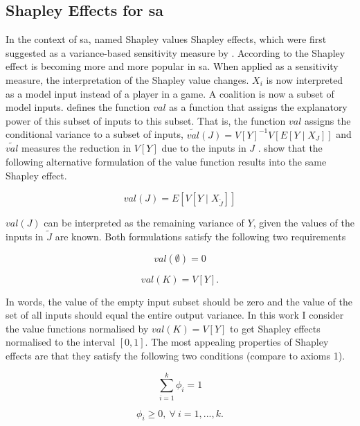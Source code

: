 \subsection{Shapley Effects for sa}

In the context of sa, \cite{SNS16} named Shapley values Shapley effects, which were first suggested as a variance-based sensitivity measure by \cite{O14}. According to \cite{PRB20} the Shapley effect is becoming more and more popular in sa.
When applied as a sensitivity measure, the interpretation of the Shapley value changes. $X_i$ is now interpreted as a model input instead of a player in a game. A coalition is now a subset of model inputs. \cite{O14} defines the function $val$ as a function that assigns the explanatory power of this subset of inputs to this subset. That is, the function $val$ assigns the conditional variance to a subset of inputs, $\tilde{val}(J)=V[Y]^{-1}V[E[Y \mid X_J]]$ and $\tilde{val}$ measures the reduction in $V[Y]$ due to the inputs in $J$ \cite{SNS16}. \cite{SNS16} show that the following alternative formulation of the value function results into the same Shapley effect.

\begin{equation}
val(J)=E[V[Y \mid X_{\tilde J}]]
\end{equation}

$val(J)$ can be interpreted as the remaining variance of $Y$, given the values of the inputs in $\tilde J$ are known. Both formulations satisfy the following two requirements

\begin{equation}
val(\emptyset) = 0
\end{equation}

\begin{equation}
val(K)=V[Y].
\end{equation}

In words, the value of the empty input subset should be zero and the value of the set of all inputs should equal the entire output variance. In this work I consider the value functions normalised by $val(K)=V[Y] $ to get Shapley effects normalised to the interval $ [0, 1] $. The most appealing properties of Shapley effects are that they satisfy the following two conditions (compare to axioms 1).

\begin{equation}
\sum_{i=1}^{k}\phi_i = 1
\end{equation}

\begin{equation}
\phi_i \geq 0,\ \forall \ i=1, ..., k.
\end{equation}

